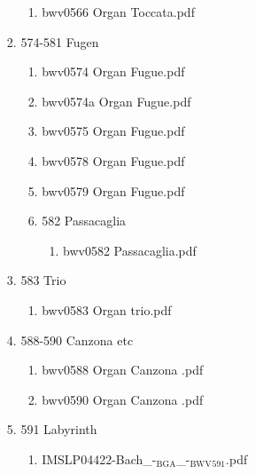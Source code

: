 \documentclass[11pt]{article}
\begin{document}
\begin{enumerate}
\begin{enumerate}
\begin{enumerate}
\begin{enumerate}
\item bwv0566   Organ Toccata.pdf
\label{sec-1-1-1-1-44-6-4-1-5-3}
\end{enumerate}

\item 574-581 Fugen
\label{sec-1-1-1-1-44-6-4-1-6}
\begin{enumerate}
\item bwv0574   Organ Fugue.pdf
\label{sec-1-1-1-1-44-6-4-1-6-1}

\item bwv0574a Organ Fugue.pdf
\label{sec-1-1-1-1-44-6-4-1-6-2}

\item bwv0575   Organ Fugue.pdf
\label{sec-1-1-1-1-44-6-4-1-6-3}

\item bwv0578   Organ Fugue.pdf
\label{sec-1-1-1-1-44-6-4-1-6-4}

\item bwv0579   Organ Fugue.pdf
\label{sec-1-1-1-1-44-6-4-1-6-5}

\item 582 Passacaglia
\label{sec-1-1-1-1-44-6-4-1-6-6}
\begin{enumerate}
\item bwv0582  Passacaglia.pdf
\label{sec-1-1-1-1-44-6-4-1-6-6-1}
\end{enumerate}
\end{enumerate}

\item 583 Trio
\label{sec-1-1-1-1-44-6-4-1-7}
\begin{enumerate}
\item bwv0583   Organ trio.pdf
\label{sec-1-1-1-1-44-6-4-1-7-1}
\end{enumerate}

\item 588-590 Canzona etc
\label{sec-1-1-1-1-44-6-4-1-8}
\begin{enumerate}
\item bwv0588   Organ Canzona .pdf
\label{sec-1-1-1-1-44-6-4-1-8-1}

\item bwv0590   Organ Canzona .pdf
\label{sec-1-1-1-1-44-6-4-1-8-2}
\end{enumerate}

\item 591 Labyrinth
\label{sec-1-1-1-1-44-6-4-1-9}
\begin{enumerate}
\item IMSLP04422-Bach\_-$_{\text{BGA}}$\_-$_{\text{BWV}}$$_{\text{591}}$.pdf
\label{sec-1-1-1-1-44-6-4-1-9-1}
\end{enumerate}


\end{enumerate}
\end{enumerate}
\end{enumerate}
\end{document}
